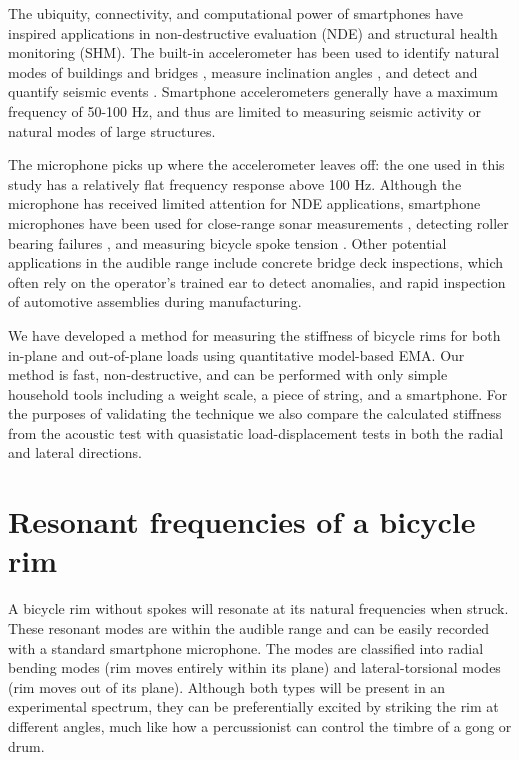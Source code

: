 \documentclass[../thesis.tex]{subfiles}
\begin{document}
The ubiquity, connectivity, and computational power of smartphones have inspired applications in non-destructive evaluation (NDE) and structural health monitoring (SHM). The built-in accelerometer has been used to identify natural modes of buildings and bridges \cite{Feng2015}, measure inclination angles \cite{Morgenthal2012}, and detect and quantify seismic events \cite{Kong2016}. Smartphone accelerometers generally have a maximum frequency of 50-100 Hz, and thus are limited to measuring seismic activity or natural modes of large structures.

The microphone picks up where the accelerometer leaves off: the one used in this study has a relatively flat frequency response above 100 Hz. Although the microphone has received limited attention for NDE applications, smartphone microphones have been used for close-range sonar measurements \cite{Morgenthal2012}, detecting roller bearing failures \cite{Grebenik2016}, and measuring bicycle spoke tension \cite{Pepelko2016}. Other potential applications in the audible range include concrete bridge deck inspections, which often rely on the operator's trained ear to detect anomalies, and rapid inspection of automotive assemblies during manufacturing.

We have developed a method for measuring the stiffness of bicycle rims for both in-plane and out-of-plane loads using quantitative model-based EMA. Our method is fast, non-destructive, and can be performed with only simple household tools including a weight scale, a piece of string, and a smartphone. For the purposes of validating the technique we also compare the calculated stiffness from the acoustic test with quasistatic load-displacement tests in both the radial and lateral directions.


\section{Resonant frequencies of a bicycle rim}

A bicycle rim without spokes will resonate at its natural frequencies when struck. These resonant modes are within the audible range and can be easily recorded with a standard smartphone microphone. The modes are classified into radial bending modes (rim moves entirely within its plane) and lateral-torsional modes (rim moves out of its plane). Although both types will be present in an experimental spectrum, they can be preferentially excited by striking the rim at different angles, much like how a percussionist can control the timbre of a gong or drum.
\end{document}
